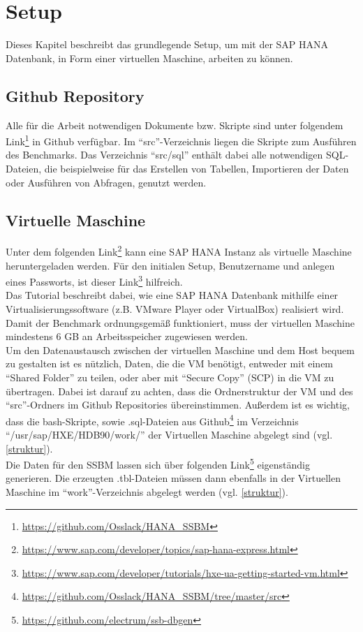 \chapter{Setup}\label{chapter:setup}
Dieses Kapitel beschreibt das grundlegende Setup, um mit der SAP HANA Datenbank, in Form einer virtuellen Maschine, arbeiten zu können.

\section{Github Repository}
Alle für die Arbeit notwendigen Dokumente bzw. Skripte sind unter folgendem Link\footnote{\url{https://github.com/Osslack/HANA_SSBM}} in Github verfügbar. Im \enquote{src}-Verzeichnis liegen die Skripte zum Ausführen des Benchmarks. Das Verzeichnis \enquote{src/sql} enthält dabei alle notwendigen SQL-Dateien, die beispielweise für das Erstellen von Tabellen, Importieren der Daten oder Ausführen von Abfragen, genutzt werden. 


\section{Virtuelle Maschine}
Unter dem folgenden Link\footnote{\url{https://www.sap.com/developer/topics/sap-hana-express.html}}  kann eine SAP HANA Instanz als virtuelle Maschine heruntergeladen werden. Für den initialen Setup, Benutzername und anlegen eines Passworts, ist dieser Link\footnote{\url{https://www.sap.com/developer/tutorials/hxe-ua-getting-started-vm.html}}  hilfreich.\\
Das Tutorial beschreibt dabei, wie eine SAP HANA Datenbank mithilfe einer Virtualisierungssoftware (z.B. VMware Player oder VirtualBox) realisiert wird.\\Damit der Benchmark ordnungsgemäß funktioniert, muss der virtuellen Maschine mindestens 6 GB an Arbeitsspeicher zugewiesen werden. \\Um den Datenaustausch zwischen der virtuellen Maschine und dem Host bequem zu gestalten ist es nützlich, Daten, die die VM benötigt, entweder mit einem \enquote{Shared Folder} zu teilen, oder aber mit \enquote{Secure Copy} (SCP) in die VM zu übertragen. Dabei ist darauf zu achten, dass die Ordnerstruktur der VM und des \enquote{src}-Ordners im Github Repositories  übereinstimmen. Außerdem ist es wichtig, dass die bash-Skripte, sowie .sql-Dateien aus Github\footnote{\url{https://github.com/Osslack/HANA_SSBM/tree/master/src}} im Verzeichnis \enquote{/usr/sap/HXE/HDB90/work/}  der Virtuellen Maschine abgelegt sind (vgl. \autoref{struktur}). \\Die Daten für den SSBM lassen sich über folgenden Link\footnote{\url{https://github.com/electrum/ssb-dbgen}} eigenständig generieren. Die erzeugten .tbl-Dateien müssen dann ebenfalls in der Virtuellen Maschine im \enquote{work}-Verzeichnis abgelegt werden (vgl. \autoref{struktur}).

